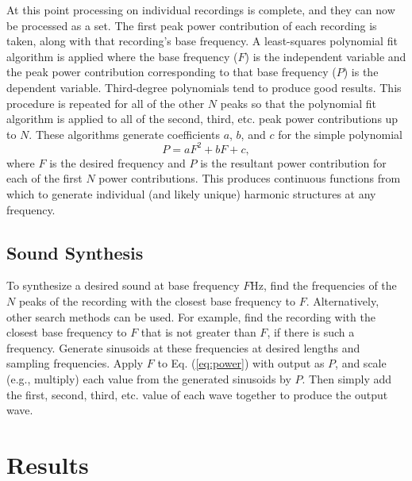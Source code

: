 \documentclass[twocolumn]{article}
\begin{document}
At this point processing on individual recordings is complete, and they can now be processed as a set. The first peak power contribution of each recording is taken, along with that recording's base frequency. A least-squares polynomial fit algorithm is applied where the base frequency ($F$) is the independent variable and the peak power contribution corresponding to that base frequency ($P$) is the dependent variable. Third-degree polynomials tend to produce good results. This procedure is repeated for all of the other $N$ peaks so that the polynomial fit algorithm is applied to all of the second, third, etc. peak power contributions up to $N$. These algorithms generate coefficients $a$, $b$, and $c$ for the simple polynomial \begin{equation} \label{eq:power} P = aF^2 + bF + c,\end{equation} where $F$ is the desired frequency and $P$ is the resultant power contribution for each of the first $N$ power contributions. This produces continuous functions from which to generate individual (and likely unique) harmonic structures at any frequency.

\subsection{Sound Synthesis}

To synthesize a desired sound at base frequency $F$Hz, find the frequencies of the $N$ peaks of the recording with the closest base frequency to $F$. Alternatively, other search methods can be used. For example, find the recording with the closest base frequency to $F$ that is not greater than $F$, if there is such a frequency. Generate sinusoids at these frequencies at desired lengths and sampling frequencies. Apply $F$ to Eq. (\ref{eq:power}) with output as $P$, and scale (e.g., multiply) each value from the generated sinusoids by $P$. Then simply add the first, second, third, etc. value of each wave together to produce the output wave.

\section{Results}
\end{document}
